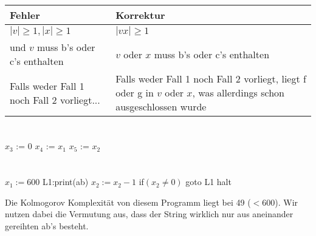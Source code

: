 \documentclass{article}
\begin{document}
\section{}
\begin{tabularx}{\textwidth}{X|X}
Fehler & Korrektur \\
\hline
$|v|\geq 1, |x| \geq 1$ & $|vx| \geq 1$\\
und $v$ muss b's oder c's enthalten & $v$ oder $x$ muss b's oder c's enthalten\\
Falls weder Fall 1 noch Fall 2 vorliegt... & Falls weder Fall 1 noch Fall 2 vorliegt, liegt f oder g in $v$ oder $x$, was allerdings schon ausgeschlossen wurde
\end{tabularx}

\section{}

\section{}
\begin{algorithm}
$x_3$ := 0\;
$x_4$ := $x_1$\;
$x_5$ := $x_2$\;
\end{algorithm}

\section{}
\begin{algorithm}
\DontPrintSemicolon
$x_1:=600$\;
L1:print(ab)\;
$x_2:=x_2-1$\;
if$(x_2\neq0)$ goto L1\;
halt\;
\end{algorithm}
Die Kolmogorov Komplexität von diesem Programm liegt bei 49 ($<600$). Wir nutzen dabei die Vermutung aus, dass der String wirklich nur aus aneinander gereihten ab's besteht.
\end{document}
